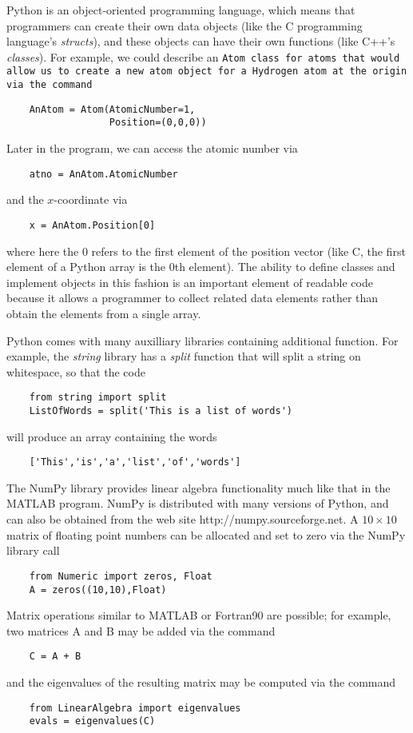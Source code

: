 \documentclass[twocolumn]{revtex4}
\begin{document}
Python is an object-oriented programming language, which means that
programmers can create their own data objects (like the C programming
language's \emph{structs}), and these objects can have their own
functions (like C++'s \emph{classes}). For example, we could describe
an \tt{Atom} class for atoms that would allow us to create a new atom
object for a Hydrogen atom at the origin via the command
\begin{verbatim}
    AnAtom = Atom(AtomicNumber=1,
                  Position=(0,0,0))
\end{verbatim}
Later in the program, we can access the atomic number via
\begin{verbatim}
    atno = AnAtom.AtomicNumber
\end{verbatim}
and the $x$-coordinate via
\begin{verbatim}
    x = AnAtom.Position[0]
\end{verbatim}
where here the 0 refers to the first element of the position vector
(like C, the first element of a Python array is the 0th element). The
ability to define classes and implement objects in this fashion is an
important element of readable code because it allows a programmer to
collect related data elements rather than obtain the elements from a
single array.

Python comes with many auxilliary libraries containing additional
function. For example, the \emph{string} library has a \emph{split}
function that will split a string on whitespace, so that the code
\begin{verbatim}
    from string import split
    ListOfWords = split('This is a list of words')
\end{verbatim}
will produce an array containing the words
\begin{verbatim}
    ['This','is','a','list','of','words']
\end{verbatim}

The NumPy library provides linear algebra functionality much like that
in the MATLAB program. NumPy is distributed with many versions of
Python, and can also be obtained from the web site
http://numpy.sourceforge.net. A $10\times 10$ matrix of floating point
numbers can be allocated and set to zero via the NumPy library call
\begin{verbatim}
    from Numeric import zeros, Float
    A = zeros((10,10),Float)
\end{verbatim}
Matrix operations similar to MATLAB or Fortran90 are possible; for
example, two matrices A and B may be added via the command
\begin{verbatim}
    C = A + B
\end{verbatim}
and the eigenvalues of the resulting matrix may be computed via the
command 
\begin{verbatim}
    from LinearAlgebra import eigenvalues
    evals = eigenvalues(C)
\end{verbatim}
\end{document}
